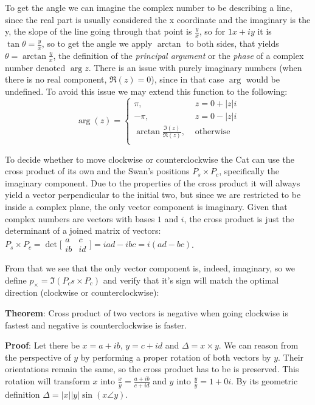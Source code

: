 \documentclass[12pt]{article}
\begin{document}
To get the angle we can imagine the complex number to be describing a line, since the real part is usually considered the x coordinate and the imaginary is the y, the slope of the line going through that point is $\frac{y}{x}$, so for $1x + iy$ it is $\tan \theta = \frac{y}{x}$, so to get the angle we apply $\arctan$ to both sides, that yields $\theta = \arctan{\frac{y}{x}}$, the definition of the \textit{principal argument}\cite{princarg} or the \textit{phase} of a complex number denoted $\arg z$. There is an issue with purely imaginary numbers (when there is no real component, $\Re (z) = 0$), since in that case $\arg$ would be undefined. To avoid this issue we may extend this function to the following: $$
\arg (z) = \left\{ 
		\begin{aligned}
			\pi						,\hspace{4pt}&  z = 0 + |z|i\\
			-\pi					,\hspace{4pt}&  z = 0 - |z|i\\
			\arctan {\frac{\Im (z)}{\Re (z)}}	,\hspace{4pt}&	\text{otherwise}\\
		\end{aligned}
	\right.$$

To decide whether to move clockwise or counterclockwise the Cat can use the cross product of its own and the Swan's positions $P_s \times P_c$, specifically the imaginary component. Due to the properties of the cross product it will always yield a vector perpendicular to the initial two, but since we are restricted to be inside a complex plane, the only vector component is imaginary. Given that complex numbers are vectors with bases $1$ and $i$, the cross product is just the determinant of a joined matrix of vectors: $P_s \times P_c = \det \bigl[ \begin{smallmatrix} 
	a & c\\
	ib & id 
  \end{smallmatrix} \bigr] = iad - ibc = i(ad - bc)$.

From that we see that the only vector component is, indeed, imaginary, so we define $p_\times = \Im{(P_cs \times P_c)}$ and verify that it's sign will match the optimal direction (clockwise or counterclockwise):

\textbf{Theorem}: Cross product of two vectors is negative when going clockwise is fastest and negative is counterclockwise is faster.

\textbf{Proof}: 
Let there be $x = a + ib$, $y = c + id$ and $\Delta = x \times y$. We can reason from the perspective of $y$ by performing a proper rotation\cite{rotation} of both vectors by $y$. Their orientations remain the same, so the cross product has to be is preserved. This rotation will transform $x$ into $\frac{x}{y} = \frac{a + ib}{c + id}$ and $y$ into $\frac{y}{y} = 1 + 0i$. By its geometric definition $\Delta = |x| |y| \sin (x \angle y)$. 
\end{document}

